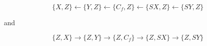 $$\{X, Z\} \leftarrow \{Y, Z\} \leftarrow \{C_f, Z\} \leftarrow \{SX, Z\} \leftarrow \{SY, Z\}$$

and

$$\{Z, X\} \rightarrow \{Z, Y\} \rightarrow \{Z, C_f\} \rightarrow \{Z, SX\} \rightarrow \{Z, SY\}$$
